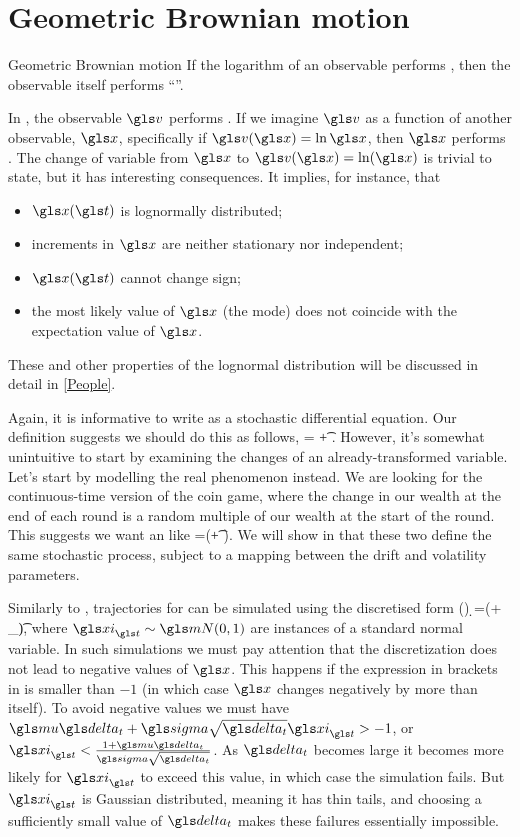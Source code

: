 \section{Geometric Brownian motion}
\begin{defn}{Geometric Brownian motion}
If the logarithm of an observable performs \BM, then the observable itself performs ``\GBM''.
\end{defn}
In , the observable $\gv$ performs \BM. If we imagine $\gv$ as a function of another observable, $\x$, specifically if $\gv(\x)=\ln\x$, then $\x$ performs \GBM. The change of variable from $\x$ to $\gv(\x)=\ln(\x)$ is trivial to state, but it has interesting consequences. It implies, for instance, that 
\begin{itemize}
\item $\x(\t)$ is lognormally distributed;
\item increments in $\x$ are neither stationary nor independent;
\item $\x(\t)$ cannot change sign;
\item the most likely value of $\x$ (the mode) does not coincide with the expectation value of $\x$. 
\end{itemize}
These and other properties of the lognormal distribution will be discussed in detail in \cref{People}.

\boldhead{\SDE}
Again, it is informative to write \GBM as a stochastic differential equation. Our definition suggests we should do this as follows,
\be
\gd\ln\x = \tilde{\gmu}\gd\t + \tilde{\gsigma}\gd\gW.
\ee
However, it's somewhat unintuitive to start by examining the changes of an already-transformed variable. Let's start by modelling the real phenomenon instead. We are looking for the continuous-time version of the coin game, where the change in our wealth at the end of each round is a random multiple of our wealth at the start of the round. This suggests we want an \SDE like
\be
\gd\x=\x(\gmu \gd\t+ \gsigma \gd\gW).
\ee
We will show in  that these two \SDEs define the same stochastic process, subject to a mapping between the drift and volatility parameters.

Similarly to \BM, trajectories for \GBM can be simulated using the discretised form (\cf {})
\be
\d \x=\x(\gmu \dt+ \gsigma \sqrt{\dt} \gxi_\t),
\ee
where $\gxi_\t \sim \mN(0,1)$ are instances of a standard normal variable. In such simulations we must pay attention that the discretization does not lead to negative values of $\x$. This 
happens if the expression in brackets in  is smaller than $-1$ (in which case $\x$ changes negatively by more than itself). To avoid negative values we must have $\gmu \dt + \gsigma \sqrt{\dt} \gxi_\t>-1$, or  $\gxi_\t <\frac{1+\gmu\dt}{\gsigma \sqrt{\dt}}$. As $\dt$ becomes large it becomes more likely for $\gxi_\t$ to exceed this value, in which case the simulation fails. But $\gxi_\t$ is Gaussian distributed, meaning it has thin tails, and choosing a sufficiently small value of $\dt$ makes these failures essentially impossible.

